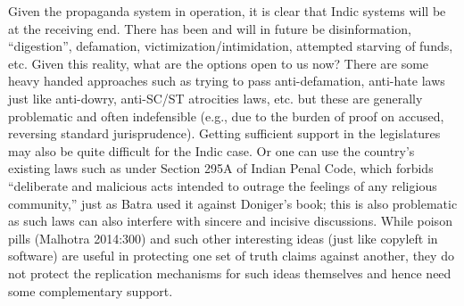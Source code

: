 Given the propaganda system in operation, it is clear that Indic systems will be at the receiving end. There has been and will in future be disinformation, “digestion”, defamation, victimization/intimidation, attempted starving of funds, etc. Given this reality, what are the options open to us now? There are some heavy handed approaches such as trying to pass anti-defamation, anti-hate laws just like anti-dowry, anti-SC/ST atrocities laws, etc. but these are generally problematic and often indefensible (e.g., due to the burden of proof on accused, reversing standard jurisprudence). Getting sufficient support in the legislatures may also be quite difficult for the Indic case. Or one can use the country’s existing laws such as under Section 295A of Indian Penal Code, which forbids “deliberate and malicious acts intended to outrage the feelings of any religious community,” just as Batra used it against Doniger’s book; this is also problematic as such laws can also interfere with sincere and incisive discussions. While poison pills (Malhotra 2014:300) and such other interesting ideas (just like copyleft in software) are useful in protecting one set of truth claims against another, they do not protect the replication mechanisms for such ideas themselves and hence need some complementary support.

